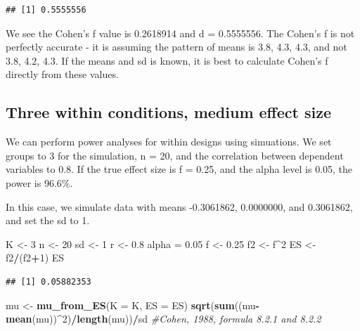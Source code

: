 \documentclass[]{article}
\newenvironment{Shaded}{\begin{snugshade}}{\end{snugshade}}
\newcommand{\KeywordTok}[1]{\textcolor[rgb]{0.13,0.29,0.53}{\textbf{#1}}}
\newcommand{\DataTypeTok}[1]{\textcolor[rgb]{0.13,0.29,0.53}{#1}}
\newcommand{\DecValTok}[1]{\textcolor[rgb]{0.00,0.00,0.81}{#1}}
\newcommand{\FloatTok}[1]{\textcolor[rgb]{0.00,0.00,0.81}{#1}}
\newcommand{\StringTok}[1]{\textcolor[rgb]{0.31,0.60,0.02}{#1}}
\newcommand{\CommentTok}[1]{\textcolor[rgb]{0.56,0.35,0.01}{\textit{#1}}}
\newcommand{\OperatorTok}[1]{\textcolor[rgb]{0.81,0.36,0.00}{\textbf{#1}}}
\newcommand{\NormalTok}[1]{#1}
\begin{document}
\begin{verbatim}
## [1] 0.5555556
\end{verbatim}

We see the Cohen's f value is 0.2618914 and d = 0.5555556. The Cohen's f
is not perfectly accurate - it is assuming the pattern of means is 3.8,
4.3, 4.3, and not 3.8, 4.2, 4.3. If the means and sd is known, it is
best to calculate Cohen's f directly from these values.

\subsection{Three within conditions, medium effect
size}\label{three-within-conditions-medium-effect-size}

We can perform power analyses for within designs using simuations. We
set groups to 3 for the simulation, n = 20, and the correlation between
dependent variables to 0.8. If the true effect size is f = 0.25, and the
alpha level is 0.05, the power is 96.6\%.

In this case, we simulate data with means -0.3061862, 0.0000000, and
0.3061862, and set the sd to 1.

\begin{Shaded}
\begin{Highlighting}[]
\NormalTok{K <-}\StringTok{ }\DecValTok{3}
\NormalTok{n <-}\StringTok{ }\DecValTok{20}
\NormalTok{sd <-}\StringTok{ }\DecValTok{1}
\NormalTok{r <-}\StringTok{ }\FloatTok{0.8}
\NormalTok{alpha =}\StringTok{ }\FloatTok{0.05}
\NormalTok{f <-}\StringTok{ }\FloatTok{0.25}
\NormalTok{f2 <-}\StringTok{ }\NormalTok{f}\OperatorTok{^}\DecValTok{2}
\NormalTok{ES <-}\StringTok{ }\NormalTok{f2}\OperatorTok{/}\NormalTok{(f2}\OperatorTok{+}\DecValTok{1}\NormalTok{)}
\NormalTok{ES}
\end{Highlighting}
\end{Shaded}

\begin{verbatim}
## [1] 0.05882353
\end{verbatim}

\begin{Shaded}
\begin{Highlighting}[]
\NormalTok{mu <-}\StringTok{ }\KeywordTok{mu_from_ES}\NormalTok{(}\DataTypeTok{K =}\NormalTok{ K, }\DataTypeTok{ES =}\NormalTok{ ES)}
\KeywordTok{sqrt}\NormalTok{(}\KeywordTok{sum}\NormalTok{((mu}\OperatorTok{-}\KeywordTok{mean}\NormalTok{(mu))}\OperatorTok{^}\DecValTok{2}\NormalTok{)}\OperatorTok{/}\KeywordTok{length}\NormalTok{(mu))}\OperatorTok{/}\NormalTok{sd }\CommentTok{#Cohen, 1988, formula 8.2.1 and 8.2.2}
\end{Highlighting}
\end{Shaded}
\end{document}
